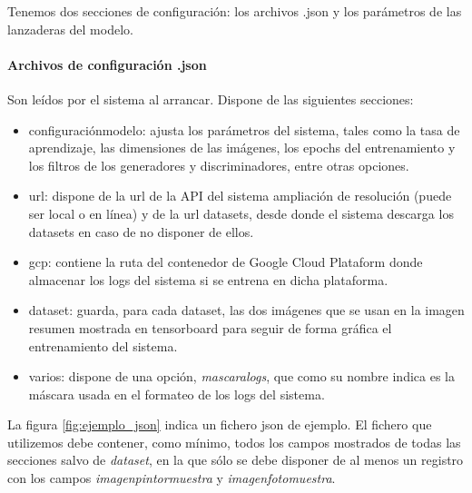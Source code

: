\documentclass[../main.tex]{subfiles}
\begin{document}
Tenemos dos secciones de configuración: los archivos .json y los parámetros de las lanzaderas del modelo.

    \paragraph{Archivos de configuración .json}
    Son leídos por el sistema al arrancar. Dispone de las siguientes secciones:
    \begin{itemize}
        \item configuración\textunderscore modelo: ajusta los parámetros del sistema, tales como la tasa de aprendizaje, las dimensiones de las imágenes, los epochs del entrenamiento y los filtros de los generadores y discriminadores, entre otras opciones.
        \item url: dispone de la url de la API del sistema ampliación de resolución (puede ser local o en línea) y de la url datasets, desde donde el sistema descarga los datasets en caso de no disponer de ellos.
        \item gcp: contiene la ruta del contenedor de Google Cloud Plataform donde almacenar los logs del sistema si se entrena en dicha plataforma.
        \item dataset: guarda, para cada dataset, las dos imágenes que se usan en la imagen resumen mostrada en tensorboard para seguir de forma gráfica el entrenamiento del sistema.
        \item varios: dispone de una opción, \textit{mascara\textunderscore logs}, que como su nombre indica es la máscara usada en el formateo de los logs del sistema.
    \end{itemize}
    
    La figura \ref{fig:ejemplo_json} indica un fichero json de ejemplo. El fichero que utilizemos debe contener, como mínimo, todos los campos mostrados de todas las secciones salvo de \textit{dataset}, en la que sólo se debe disponer de al menos un registro con los campos \textit{imagen\textunderscore pintor\textunderscore muestra} y \textit{imagen\textunderscore foto\textunderscore muestra}.
    
\end{document}

